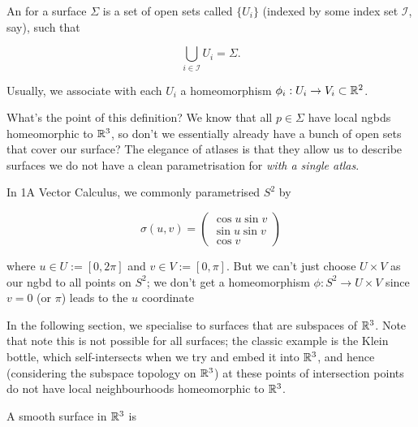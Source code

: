 \documentclass[11pt]{scrartcl}
\begin{document}
\begin{definition}
An  for a surface $\Sigma$ is a set of open sets called  $\{ U_i \}$ (indexed by some index set $\mathcal{I}$, say), such that 

\begin{equation}
    \bigcup_{i \in \mathcal{I}} U_i = \Sigma.
\end{equation}

Usually, we associate with each $U_i$ a homeomorphism $\phi_i : U_i \rightarrow V_i \subset \mathbb R^2$.
\end{definition}

What's the point of this definition? We know that all $p \in \Sigma$ have local ngbds homeomorphic to $\mathbb R^3$, so don't we essentially already have a bunch of open sets that cover our surface? The elegance of atlases is that they allow us to describe surfaces we do not have a clean parametrisation for \textit{with a single atlas}.

\begin{example}

In 1A Vector Calculus, we commonly parametrised $S^2$ by

\begin{equation}
    \sigma(u, v) = \begin{pmatrix}\cos u \sin v\\ \sin u \sin v\\ \cos v \end{pmatrix}
\end{equation}

where $u \in U := [0, 2 \pi]$ and $v \in V := [0, \pi]$. But we can't just choose $U \times V$ as our ngbd to all points on $S^2$; we don't get a homeomorphism $\phi : S^2 \rightarrow U \times V$ since $v = 0$ (or $\pi$) leads to the $u$ coordinate 
\end{example}

In the following section, we specialise to surfaces that are subspaces of $\mathbb R^3$. Note that note this is not possible for all surfaces; the classic example is the Klein bottle, which self-intersects when we try and embed it into $\mathbb R^3$, and hence (considering the subspace topology on $\mathbb R^3$) at these points of intersection points do not have local neighbourhoods homeomorphic to $\mathbb R^3$.

\begin{definition}

A smooth surface in $\mathbb R^3$ is 
\end{definition}
\end{document}

